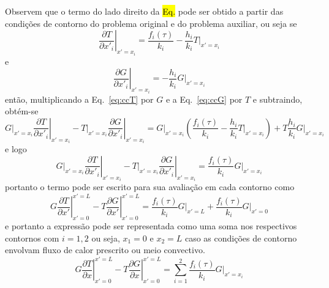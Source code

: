 Observem que o termo do lado direito da \hl{Eq.} pode ser obtido a partir das condições de contorno do problema original e do problema auxiliar, ou seja se
\begin{equation}\label{eq:ccT}
    \left.{\frac{\partial{T}}{\partial{x'_i}}}\right|_{x'=x_i} =
    \frac{f_i(\tau)}{k_i} - \frac{h_i}{k_i} \left.{T}\right|_{x'=x_i}
\end{equation}
e 
\begin{equation}\label{eq:ccG}
    \left.{\frac{\partial{G}}{\partial{x'_i}}}\right|_{x'=x_i} =
    -\frac{h_i}{k_i} \left.{G}\right|_{x'=x_i}
\end{equation}
então, multiplicando a Eq.~\ref{eq:ccT} por $G$ e a Eq.~\ref{eq:ccG} por $T$ e subtraindo, obtém-se 
\begin{equation}\label{eq:ccTG}
    \left.{G}\right|_{x'=x_i}\left.{\frac{\partial{T}}{\partial{x'_i}}}\right|_{x'=x_i} - 
    \left.{T}\right|_{x'=x_i} \left.{\frac{\partial{G}}{\partial{x'_i}}}\right|_{x'=x_i} = 
    \left.{G}\right|_{x'=x_i} \left( \frac{f_i(\tau)}{k_i} -  \frac{h_i}{k_i} \left.{T}\right|_{x'=x_i}   \right  )  + 
    T \frac{h_i}{k_i} \left.{G}\right|_{x'=x_i}
\end{equation}
e logo
\begin{equation}\label{eq:ccTG1}
    \left.{G}\right|_{x'=x_i}\left.{\frac{\partial{T}}{\partial{x'_i}}}\right|_{x'=x_i} - 
    \left.{T}\right|_{x'=x_i} \left.{\frac{\partial{G}}{\partial{x'_i}}}\right|_{x'=x_i} =  
    \frac{f_i(\tau)}{k_i} \left.{G}\right|_{x'=x_i}
\end{equation}
portanto o termo pode ser escrito para sua avaliação em cada contorno como
\begin{equation}\label{eq:TGTG9}
    G \left.{\frac{\partial{T}}{\partial{x'}}}\right|^{x'=L}_{x'=0} 
   -T \left.{\frac{\partial{G}}{\partial{x'}}}\right|^{x'=L}_{x'=0} =        \frac{f_i(\tau)}{k_i} \left.{G}\right|_{x'=L} +
    \frac{f_i(\tau)}{k_i} \left.{G}\right|_{x'=0}
\end{equation}			
e portanto a expressão pode ser representada como uma soma nos respectivos contornos com $i= 1, 2$ ou seja,  $x_1=0$ e $x_2=L$ caso as condições de contorno envolvam fluxo de calor prescrito ou meio convectivo. 
\begin{equation}\label{eq:TGTG10}
    G \left.{\frac{\partial{T}}{\partial{x}}}\right|^{x'=L}_{x'=0}
  - T \left.{\frac{\partial{G}}{\partial{x}}}\right|^{x'=L}_{x'=0} =
    \sum_{i=1}^{2} \frac{f_i(\tau)}{k_i} \left.{G}\right|_{x'=x_i}
\end{equation}

